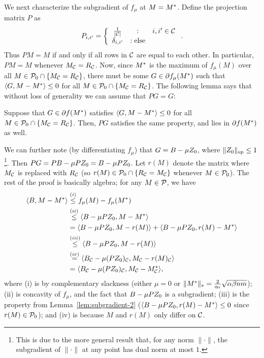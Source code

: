 We next characterize the subgradient of $f_{\mu}$ at $M = M^*$.
Define the projection matrix $P$ as
\[ P_{i,i'} = \left\{ \begin{array}{ccl} \frac{1}{|\mathcal{C}|} & : & i, i' \in \mathcal{C} \\ \delta_{i,i'} & : \text{else} \end{array} \right.. \]
Thus $PM = M$ if and only if all rows in $\mathcal{C}$ are equal to each other.
In particular, $PM = M$ whenever $M_{\mathcal{C}} = R_{\mathcal{C}}$. Now, since $M^*$ is the maximum 
of $f_{\mu}(M)$ over all $M \in \mathcal{P}_0 \cap \{M_{\mathcal{C}} = R_{\mathcal{C}}\}$, there must be some 
$G \in \partial f_{\mu}(M^*)$ such that $\langle G, M - M^* \rangle \leq 0$ for all $M \in \mathcal{P}_0 \cap \{M_{\mathcal{C}} = R_{\mathcal{C}}\}$. The following lemma says that without 
loss of generality we can assume that $PG = G$:
\begin{lemma}
\label{lem:subgradient-2}
Suppose that $G \in \partial f(M^*)$ satisfies $\langle G, M - M^* \rangle \leq 0$ 
for all $M \in \mathcal{P}_0 \cap \{M_{\mathcal{C}} = R_{\mathcal{C}}\}$. 
Then, $PG$ satisfies the same property, and lies in $\partial f(M^*)$ as well.
\end{lemma}
We can further note (by differentiating $f_{\mu}$) that 
$G = B - \mu Z_0$, where $\|Z_0\|_{\mathrm{op}} \leq 1$\footnote{This is due to the 
more general result that, for any norm $\|\cdot\|$, the subgradient of $\|\cdot\|$ 
at any point has dual norm at most $1$.}. Then
$PG = PB - \mu PZ_0 = B - \mu PZ_0$. Let $r(M)$ denote the 
matrix where $M_{\mathcal{C}}$ is replaced with $R_{\mathcal{C}}$ (so $r(M) \in \mathcal{P}_0 \cap \{R_{\mathcal{C}} = M_{\mathcal{C}}\}$ 
whenever $M \in \mathcal{P}_0$). The rest of the proof is basically algebra; for any 
$M \in \mathcal{P}$, we have
\begin{align}
\langle B, M - M^* \rangle &\stackrel{(i)}{\leq} f_{\mu}(M) - f_{\mu}(M^*) \\
 &\stackrel{(ii)}{\leq} \langle B - \mu PZ_0, M - M^* \rangle \\
 &= \langle B - \mu PZ_0, M - r(M) \rangle + \langle B - \mu PZ_0, r(M) - M^* \rangle \\
 &\stackrel{(iii)}{\leq} \langle B - \mu PZ_0, M - r(M) \rangle \\
 &\stackrel{(iv)}{=} \langle B_{\mathcal{C}} - \mu (PZ_0)_{\mathcal{C}}, M_{\mathcal{C}} - r(M)_{\mathcal{C}} \rangle \\
 &= \langle B_{\mathcal{C}} - \mu (PZ_0)_{\mathcal{C}}, M_{\mathcal{C}} - M^*_{\mathcal{C}} \rangle,
\end{align}
where (i) is by complementary slackness (either $\mu = 0$ or $\|M^*\|_* = \frac{2}{\alpha\epsilon}\sqrt{\alpha\beta nm}$); 
(ii) is concavity of $f_{\mu}$, and the fact that $B - \mu PZ_0$ is a subgradient;  
(iii) is the property from Lemma~\ref{lem:subgradient-2} ($\langle B - \mu PZ_0, r(M) - M^* \rangle \leq 0$ since 
$r(M) \in \mathcal{P}_0$); and (iv) is because $M$ and $r(M)$ only differ on $\mathcal{C}$.


